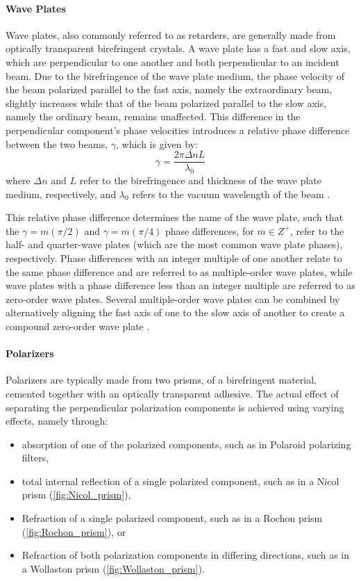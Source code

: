 \paragraph{Wave Plates}
Wave plates, also commonly referred to as retarders, are generally made from optically transparent birefringent crystals. A wave plate has a fast and slow axis, which are perpendicular to one another and both perpendicular to an incident beam. Due to the birefringence of the wave plate medium, the phase velocity of the beam polarized parallel to the fast axis, namely the extraordinary beam, slightly increases while that of the beam polarized parallel to the slow axis, namely the ordinary beam, remains unaffected. This difference in the perpendicular component's phase velocities introduces a relative phase difference between the two beams, $\gamma$, which is given by:
\begin{equation}
    \gamma = \frac{2 \pi \Delta n L}{\lambda_{0}}
\end{equation}
where $\Delta n$ and $L$ refer to the birefringence and thickness of the wave plate medium, respectively, and $\lambda_{0}$ refers to the vacuum wavelength of the beam \citep{Hecht_optics}.

This relative phase difference determines the name of the wave plate, such that the $\gamma = m(\pi/2) $ and $\gamma = m(\pi/4)$ phase differences, for $m \in Z^{+}$, refer to the half- and quarter-wave plates (which are the most common wave plate phases), respectively. Phase differences with an integer multiple of one another relate to the same phase difference and are referred to as multiple-order wave plates, while wave plates with a phase difference less than an integer multiple are referred to as zero-order wave plates. Several multiple-order wave plates can be combined by alternatively aligning the fast axis of one to the slow axis of another to create a compound zero-order wave plate \citep{Hale_birefringence}.

\paragraph{Polarizers} \label{par:polarizer}
Polarizers are typically made from two prisms, of a birefringent material, cemented together with an optically transparent adhesive. The actual effect of separating the perpendicular polarization components is achieved using varying effects, namely through:
\begin{itemize}
    \item absorption of one of the polarized components, such as in Polaroid polarizing filters,
    \item total internal reflection of a single polarized component, such as in a Nicol prism (\autoref{fig:Nicol_prism}),
    \item Refraction of a single polarized component, such as in a Rochon prism (\autoref{fig:Rochon_prism}), or
    \item Refraction of both polarization components in differing directions, such as in a Wollaston prism (\autoref{fig:Wollaston_prism}).
\end{itemize}


